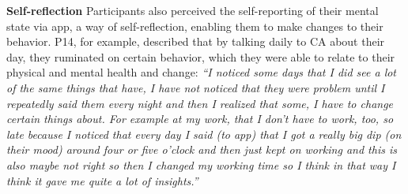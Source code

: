    \textbf{Self-reflection}
    Participants also perceived the self-reporting of their mental state via \acl{app}, a way of self-reflection, enabling them to make changes to their behavior. 
    P14, for example, described that by talking daily to \ac{CA} about their day, they ruminated on certain behavior, which they were able to relate to their physical and mental health and change:
            \textit{``I noticed some days that I did see a lot of the same things that have, I have not noticed that they were problem until I repeatedly said them every night and then I realized that some, I have to change certain things about. For example at my work, that I don't have to work, too, so late because I noticed that every day I said (to \acl{app}) that I got a really big dip (on their mood) around four or five o'clock and then just kept on working and this is also maybe not right so then I changed my working time so I think in that way I think it gave me quite a lot of insights.''
            }
